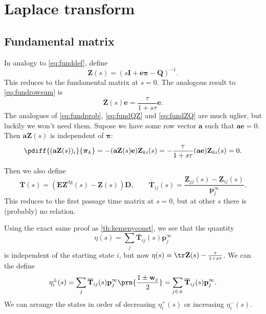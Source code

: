 \documentclass[12pt]{article}
\newcommand{\inv}{^{-1}}
\newcommand{\dg}{^\mathrm{dg}}
\newcommand{\I}{\mathbf{I}}
\newcommand{\onev}{\mathbf{e}}
\newcommand{\onem}{\mathbf{E}}
\newcommand{\MM}{\mathbf{Q}}
\newcommand{\eq}{\mathbf{p}^\infty}
\newcommand{\fpt}{\mathbf{T}}
\newcommand{\fptb}{\overline{\fpt}}
\newcommand{\fund}{\mathbf{Z}}
\newcommand{\D}{\mathbf{D}}
\newcommand{\pib}{\boldsymbol{\pi}}
\newcommand{\w}{\mathbf{w}}
\begin{document}
\section{Laplace transform}\label{sec:laplace}

\subsection{Fundamental matrix \etc}\label{sec:lfund}

In analogy to \eqref{eq:funddef}, define
%
\begin{equation}\label{eq:lfund}
  \fund(s) = (s\I +\onev\pib -\MM)\inv.
\end{equation}
%
This reduces to the fundamental matrix at $s=0$.
The analogous result to \eqref{eq:fundrowsum} is
%
\begin{equation}\label{eq:lfundrowsum}
  \fund(s)\onev = \frac{\tau}{1+s\tau}\onev.
\end{equation}
%
The analogues of \eqref{eq:fundprob}, \eqref{eq:fundQZ} and \eqref{eq:fundZQ} are much uglier, but luckily we won't need them.
Supose we have some row vector $\mathbf{a}$ such that $\mathbf{a}\onev=0$.
Then $\mathbf{a}\fund(s)$ is independent of $\pib$:
%
\begin{equation}\label{eq:alfund}
  \pdiff{(\mathbf{a}\fund(s))_i}{\pib_k} = -(\mathbf{a}\fund(s)\onev) \fund_{ki}(s) = -\frac{\tau}{1+s\tau} (\mathbf{a}\onev) \fund_{ki}(s) = 0.
\end{equation}
%


Then we also define
%
\begin{equation}\label{eq:lfptb}
  \fptb(s) = (\onem\fund\dg(s)-\fund(s))\D,
  \qquad
  \fptb_{ij}(s) = \frac{\fund_{jj}(s)-\fund_{ij}(s)}{\eq_j}.
\end{equation}
%
This reduces to the first passage time matrix at $s=0$, but at other $s$ there is (probably) no relation.

Using the exact same proof as \autoref{th:kemenyconst}, we see that the quantity
%
\begin{equation}\label{eq:lkemeny}
  \eta(s) = \sum_j \fptb_{ij}(s)\eq_j
\end{equation}
%
is independent of the starting state $i$, but now $\eta(s) = \tr\fund(s) - \frac{\tau}{1+s\tau}$.
We can the define
%
\begin{equation}\label{eq:lpmixtime}
  \eta^{\pm}_i(s) = \sum_j \fptb_{ij}(s)\eq_j \prn{\frac{1\pm\w_j}{2}} =  \sum_{j\in\pm} \fptb_{ij}(s)\eq_j.
\end{equation}
%
We can arrange the states in order of decreasing $\eta^{+}_i(s)$ or increasing $\eta^{-}_i(s)$.
\end{document}
